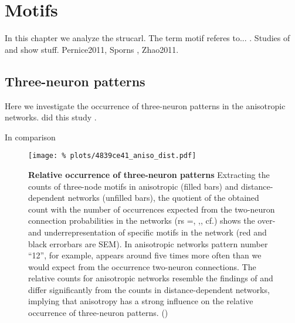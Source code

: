 
\newpage
\section{Motifs}

In this chapter we analyze the strucarl. The term motif referes
to... . Studies of \textcite{Song2005} and \textcite{Perin2011} show
stuff. Pernice2011, Sporns , Zhao2011.


\subsection*{Three-neuron patterns}

Here we investigate the occurrence of three-neuron patterns in the
anisotropic networks. \textcite{Song2005} did this study .

In comparison


\begin{figure}[H]
  \centering
  \texttt{[image: \%
    plots/4839ce41\_aniso\_dist.pdf]}



  \captionsetup{skip=8pt}
  \caption{\textbf{Relative occurrence of three-neuron patterns}
    Extracting the counts of three-node motifs in anisotropic (filled
    bars) and distance-dependent networks (unfilled bars), the
    quotient of the obtained count with the number of occurrences
    expected from the two-neuron connection probabilities in the
    networks (rs =, ,, cf.) shows the over- and underrepresentation of
    specific motifs in the network (red and black errorbars are
    SEM). In anisotropic networks pattern number \enquote{12}, for
    example, appears around five times more often than we would expect
    from the occurrence two-neuron connections. The relative counts
    for anisotropic networks resemble the findings of
    \textcite{Song2005} and differ significantly from the counts in
    distance-dependent networks, implying that anisotropy has a strong
    influence on the relative occurrence of three-neuron
    patterns. () }
  \label{fig:distance_3motif_compare}
\end{figure}


